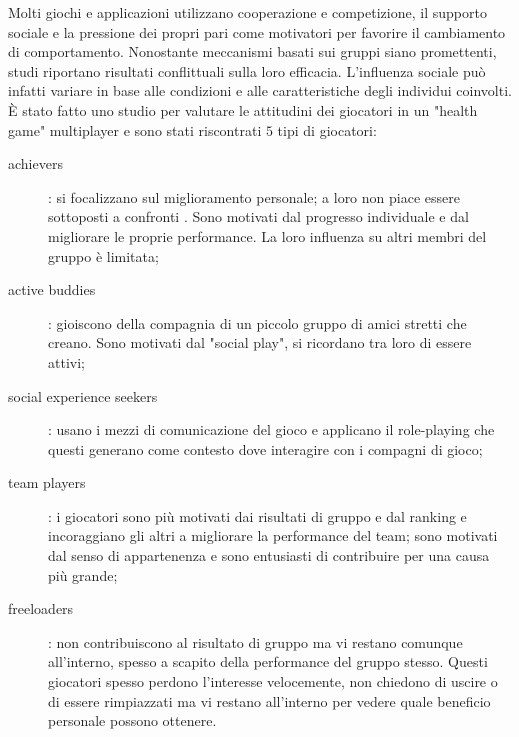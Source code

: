 Molti giochi e applicazioni utilizzano cooperazione e competizione, il supporto sociale e la pressione dei propri pari come motivatori per favorire il cambiamento di comportamento.
Nonostante meccanismi basati sui gruppi siano promettenti, studi riportano risultati conflittuali sulla loro efficacia. L'influenza sociale può infatti variare in base alle condizioni e alle caratteristiche degli individui coinvolti. È stato fatto uno studio per valutare le attitudini dei giocatori in un "health game" multiplayer e sono stati riscontrati $5$ tipi di giocatori:
\begin{description}
    \item[achievers]: si focalizzano sul miglioramento personale; a loro non piace essere sottoposti a confronti . Sono motivati dal progresso individuale e dal migliorare le proprie performance. La loro influenza su altri membri del gruppo è limitata;
    \item[active buddies]: gioiscono della compagnia di un piccolo gruppo di amici stretti che creano. Sono motivati dal "social play", si ricordano tra loro di essere attivi;
    \item[social experience seekers]: usano i mezzi di comunicazione del gioco e applicano il role-playing che questi generano come contesto dove interagire con i compagni di gioco;
    \item[team players]: i giocatori sono più motivati dai risultati di gruppo e dal ranking e incoraggiano gli altri a migliorare la performance del team; sono motivati dal senso di appartenenza e sono entusiasti di contribuire per una causa più grande;
    \item[freeloaders]: non contribuiscono al risultato di gruppo ma vi restano comunque all'interno, spesso a scapito della performance del gruppo stesso. Questi giocatori spesso perdono l'interesse velocemente, non chiedono di uscire o di essere rimpiazzati ma vi restano all'interno per vedere quale beneficio personale possono ottenere. 
\end{description}

